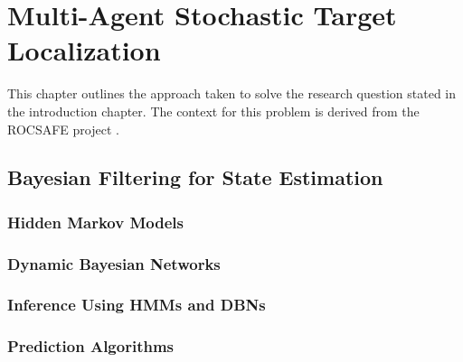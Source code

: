 

\chapter{Multi-Agent Stochastic Target Localization}
\workinprogress
This chapter outlines the approach taken to solve the research question stated in the introduction chapter. The context for this problem is derived from the ROCSAFE project \cite{rocsafeNUIG}. 

\section{Bayesian Filtering for State Estimation}

\subsection{Hidden Markov Models}

\label{Chapter:HMM}

\subsection{Dynamic Bayesian Networks}

\label{Chapter:DBN}

\subsection{Inference Using HMMs and DBNs}\label{subsection:InferenceHMMDBN}


\subsection{Prediction Algorithms}




